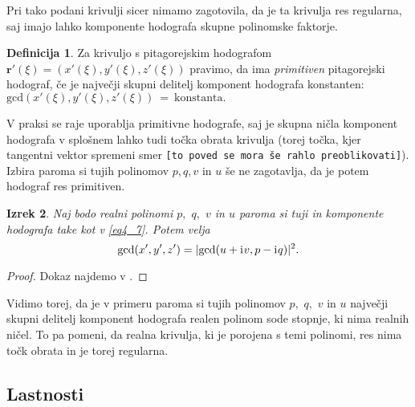\documentclass[12pt,a4paper,twoside]{article}
\newcommand{\iu}{\mathrm{i}\mkern1mu} %
\theoremstyle{definition} %
\newtheorem{definicija}{Definicija}[section]
\theoremstyle{plain} %
\newtheorem{izrek}[definicija]{Izrek}
\numberwithin{equation}{section}  %
\begin{document}
Pri tako podani krivulji sicer nimamo zagotovila, da je ta krivulja res regularna, saj imajo lahko komponente hodografa skupne polinomske faktorje.

\begin{definicija}
	\label{primitiven_hodo}
	Za krivuljo s pitagorejskim hodografom $\mathbf{r'}(\xi)=(x'(\xi),y'(\xi),z'(\xi))$ pravimo, da ima \emph{primitiven} pitagorejski hodograf, če je največji skupni delitelj komponent hodografa konstanten: $\mathrm{gcd}(x'(\xi),y'(\xi),z'(\xi))~=~\mathrm{konstanta}.$
\end{definicija}

V praksi se raje uporablja primitivne hodografe, saj je skupna ničla komponent hodografa v splošnem lahko tudi točka obrata krivulja (torej točka, kjer tangentni vektor spremeni smer \texttt{[to poved se mora še rahlo preoblikovati]}). Izbira paroma si tujih polinomov $p,q,v$ in $u$ še ne zagotavlja, da je potem hodograf res primitiven. 

\begin{izrek}
	Naj bodo realni polinomi $p,$ $q,$ $v$ in $u$ paroma si tuji in komponente hodografa take kot v \eqref{eq4_7}. Potem velja
	\begin{equation}
		\mathrm{gcd}(x',y',z')=|\mathrm{gcd}(u+\iu v,p-\iu q)|^2.
	\end{equation}
\end{izrek}
\begin{proof}
	Dokaz najdemo v \cite{faroukietal2004}.
\end{proof}

Vidimo torej, da je v primeru paroma si tujih polinomov $p,$ $q,$ $v$ in $u$ največji skupni delitelj komponent hodografa realen polinom sode stopnje, ki nima realnih ničel. To pa pomeni, da realna krivulja, ki je porojena s temi polinomi, res nima točk obrata in je torej regularna.

\subsection{Lastnosti}
\label{subsec_lastnosti}
\end{document}
